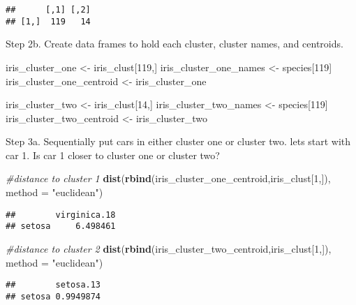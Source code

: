 \documentclass[11pt,]{article}
\newenvironment{Shaded}{\begin{snugshade}}{\end{snugshade}}
\newcommand{\CommentTok}[1]{\textcolor[rgb]{0.56,0.35,0.01}{\textit{#1}}}
\newcommand{\DataTypeTok}[1]{\textcolor[rgb]{0.13,0.29,0.53}{#1}}
\newcommand{\DecValTok}[1]{\textcolor[rgb]{0.00,0.00,0.81}{#1}}
\newcommand{\KeywordTok}[1]{\textcolor[rgb]{0.13,0.29,0.53}{\textbf{#1}}}
\newcommand{\NormalTok}[1]{#1}
\newcommand{\StringTok}[1]{\textcolor[rgb]{0.31,0.60,0.02}{#1}}
\begin{document}
\begin{verbatim}
##      [,1] [,2]
## [1,]  119   14
\end{verbatim}

Step 2b. Create data frames to hold each cluster, cluster names, and
centroids.

\begin{Shaded}
\begin{Highlighting}[]
\NormalTok{iris_cluster_one <-}\StringTok{ }\NormalTok{iris_clust[}\DecValTok{119}\NormalTok{,]}
\NormalTok{iris_cluster_one_names <-}\StringTok{ }\NormalTok{species[}\DecValTok{119}\NormalTok{]}
\NormalTok{iris_cluster_one_centroid <-}\StringTok{ }\NormalTok{iris_cluster_one}

\NormalTok{iris_cluster_two <-}\StringTok{ }\NormalTok{iris_clust[}\DecValTok{14}\NormalTok{,]}
\NormalTok{iris_cluster_two_names <-}\StringTok{ }\NormalTok{species[}\DecValTok{119}\NormalTok{]}
\NormalTok{iris_cluster_two_centroid <-}\StringTok{ }\NormalTok{iris_cluster_two}
\end{Highlighting}
\end{Shaded}

Step 3a. Sequentially put cars in either cluster one or cluster two.
lets start with car 1. Is car 1 closer to cluster one or cluster two?

\begin{Shaded}
\begin{Highlighting}[]
\CommentTok{#distance to cluster 1}
\KeywordTok{dist}\NormalTok{(}\KeywordTok{rbind}\NormalTok{(iris_cluster_one_centroid,iris_clust[}\DecValTok{1}\NormalTok{,]), }\DataTypeTok{method =} \StringTok{"euclidean"}\NormalTok{) }
\end{Highlighting}
\end{Shaded}

\begin{verbatim}
##        virginica.18
## setosa     6.498461
\end{verbatim}

\begin{Shaded}
\begin{Highlighting}[]
\CommentTok{#distance to cluster 2}
\KeywordTok{dist}\NormalTok{(}\KeywordTok{rbind}\NormalTok{(iris_cluster_two_centroid,iris_clust[}\DecValTok{1}\NormalTok{,]), }\DataTypeTok{method =} \StringTok{"euclidean"}\NormalTok{)}
\end{Highlighting}
\end{Shaded}

\begin{verbatim}
##        setosa.13
## setosa 0.9949874
\end{verbatim}
\end{document}

